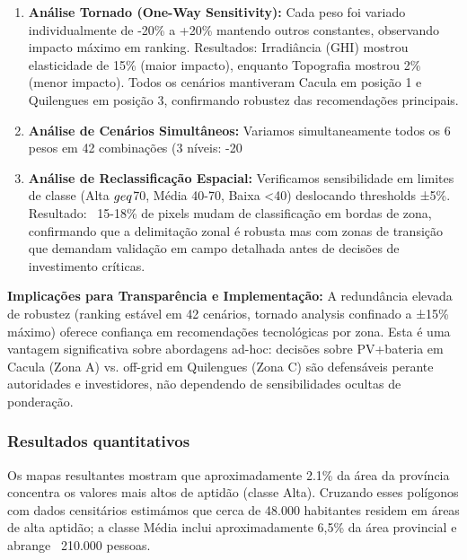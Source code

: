 \documentclass[12pt, a4paper]{article}
\begin{document}
\begin{enumerate}
  \item \textbf{Análise Tornado (One-Way Sensitivity):} Cada peso foi variado individualmente de -20\% a +20\% mantendo outros constantes, observando impacto máximo em ranking. Resultados: Irradiância (GHI) mostrou elasticidade de 15\% (maior impacto), enquanto Topografia mostrou 2\% (menor impacto). Todos os cenários mantiveram Cacula em posição 1 e Quilengues em posição 3, confirmando robustez das recomendações principais.

  \item \textbf{Análise de Cenários Simultâneos:} Variamos simultaneamente todos os 6 pesos em 42 combinações (3 níveis: -20%

  \item \textbf{Análise de Reclassificação Espacial:} Verificamos sensibilidade em limites de classe (Alta $\\geq$70, Média 40-70, Baixa <40) deslocando thresholds ±5\%. Resultado: ~15-18\% de pixels mudam de classificação em bordas de zona, confirmando que a delimitação zonal é robusta mas com zonas de transição que demandam validação em campo detalhada antes de decisões de investimento críticas.
\end{enumerate}


\noindent \textbf{Implicações para Transparência e Implementação:} A redundância elevada de robustez (ranking estável em 42 cenários, tornado analysis confinado a ±15\% máximo) oferece confiança em recomendações tecnológicas por zona. Esta é uma vantagem significativa sobre abordagens ad-hoc: decisões sobre PV+bateria em Cacula (Zona A) vs. off-grid em Quilengues (Zona C) são defensáveis perante autoridades e investidores, não dependendo de sensibilidades ocultas de ponderação.

\subsubsection{Resultados quantitativos}

Os mapas resultantes mostram que aproximadamente 2.1\% da área da província concentra os valores mais altos de aptidão (classe Alta). Cruzando esses polígonos com dados censitários estimámos que cerca de 48.000 habitantes residem em áreas de alta aptidão; a classe Média inclui aproximadamente 6,5\% da área provincial e abrange ~210.000 pessoas.
\end{document}
